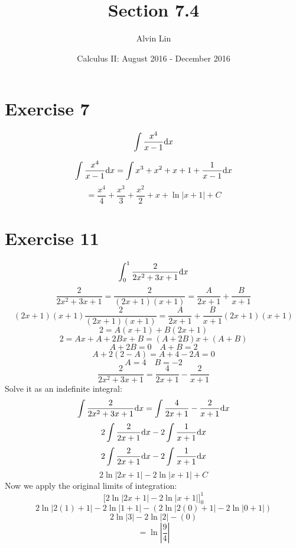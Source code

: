 \documentclass[letterpaper, 12pt]{math}
\title{Section 7.4}
\author{Alvin Lin}
\date{Calculus II: August 2016 - December 2016}
\begin{document}
\maketitle

\section*{Exercise 7}
\[ \int{\frac{x^{4}}{x-1}\mathrm{d}{x}} \]
\begin{center}
\end{center}
\[ \int{\frac{x^{4}}{x-1}\mathrm{d}{x}} =
   \int{x^{3}+x^{2}+x+1+\frac{1}{x-1}\mathrm{d}{x}} \]
\[ = \frac{x^{4}}{4}+\frac{x^{3}}{3}+\frac{x^{2}}{2}+x+\ln|x+1|+C \]

\section*{Exercise 11}
\[ \int_{0}^{1}{\frac{2}{2x^{2}+3x+1}\mathrm{d}{x}} \]
\[ \frac{2}{2x^{2}+3x+1} = \frac{2}{(2x+1)(x+1)} =
   \frac{A}{2x+1}+\frac{B}{x+1} \]
\[ (2x+1)(x+1)\frac{2}{(2x+1)(x+1)} = \frac{A}{2x+1}+\frac{B}{x+1}(2x+1)(x+1) \]
\[ 2 = A(x+1)+B(2x+1) \]
\[ 2 = Ax + A + 2Bx + B = (A+2B)x+(A+B) \]
\[ A+2B = 0 \quad A+B = 2 \]
\[ A+2(2-A) = A+4-2A = 0 \]
\[ A = 4 \quad B = -2 \]
\[ \frac{2}{2x^{2}+3x+1} = \frac{4}{2x+1}-\frac{2}{x+1} \]
Solve it as an indefinite integral:
\[ \int{\frac{2}{2x^{2}+3x+1}\mathrm{d}{x}} =
   \int{\frac{4}{2x+1}-\frac{2}{x+1}\mathrm{d}{x}} \]
\[ 2\int{\frac{2}{2x+1}\mathrm{d}{x}}-2\int{\frac{1}{x+1}\mathrm{d}{x}} \]
\[ 2\int{\frac{2}{2x+1}\mathrm{d}{x}}-2\int{\frac{1}{x+1}\mathrm{d}{x}} \]
\[ 2\ln|2x+1|-2\ln|x+1|+C \]
Now we apply the original limits of integration:
\[ \bigg[2\ln|2x+1|-2\ln|x+1|\bigg]_{0}^{1} \]
\[ 2\ln|2(1)+1|-2\ln|1+1|-(2\ln|2(0)+1|-2\ln|0+1|) \]
\[ 2\ln|3|-2\ln|2|-(0) \]
\[ = \ln|\frac{9}{4}| \]
\end{document}
